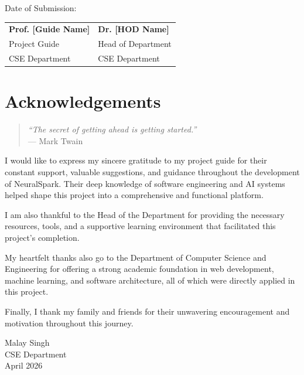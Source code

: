 \documentclass[12pt,a4paper]{report}
\begin{document}
\vspace{2cm}
\noindent Date of Submission: \hrulefill

\vspace{2.5cm}
\noindent\begin{tabular}{@{}p{7cm}p{7cm}}
\textbf{Prof. [Guide Name]} & \textbf{Dr. [HOD Name]} \\
Project Guide & Head of Department \\
CSE Department & CSE Department \\
\end{tabular}

\chapter*{Acknowledgements}

\begin{quote}
    \textit{``The secret of getting ahead is getting started.''} \\ \hfill --- Mark Twain
\end{quote}

I would like to express my sincere gratitude to my project guide for their constant support,
valuable suggestions, and guidance throughout the development of NeuralSpark. Their deep knowledge
of software engineering and AI systems helped shape this project into a comprehensive and
functional platform.

I am also thankful to the Head of the Department for providing the necessary resources, tools,
and a supportive learning environment that facilitated this project's completion.

My heartfelt thanks also go to the Department of Computer Science and Engineering for
offering a strong academic foundation in web development, machine learning, and software
architecture, all of which were directly applied in this project.

Finally, I thank my family and friends for their unwavering encouragement and motivation
throughout this journey.

\vspace{1.5cm}
\noindent Malay Singh \\
CSE Department \\
April 2026

\end{document}
